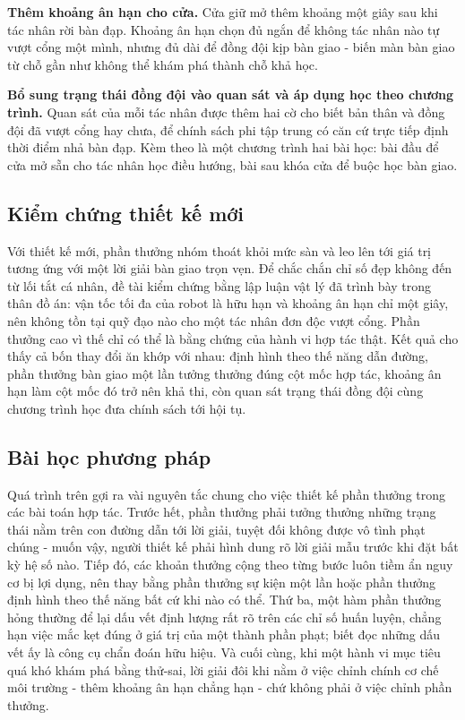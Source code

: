 \indent \textbf{Thêm khoảng ân hạn cho cửa.} Cửa giữ mở thêm khoảng một giây sau khi tác
nhân rời bàn đạp. Khoảng ân hạn chọn đủ ngắn để không tác nhân nào tự vượt cổng một mình,
nhưng đủ dài để đồng đội kịp bàn giao - biến màn bàn giao từ chỗ gần như không thể khám
phá thành chỗ khả học.

\indent \textbf{Bổ sung trạng thái đồng đội vào quan sát và áp dụng học theo chương
trình.} Quan sát của mỗi tác nhân được thêm hai cờ cho biết bản thân và đồng đội đã vượt
cổng hay chưa, để chính sách phi tập trung có căn cứ trực tiếp định thời điểm nhả bàn đạp.
Kèm theo là một chương trình hai bài học: bài đầu để cửa mở sẵn cho tác nhân học điều
hướng, bài sau khóa cửa để buộc học bàn giao.

\subsection{Kiểm chứng thiết kế mới}
\indent Với thiết kế mới, phần thưởng nhóm thoát khỏi mức sàn và leo lên tới giá trị tương
ứng với một lời giải bàn giao trọn vẹn. Để chắc chắn chỉ số đẹp không đến từ lối tắt cá
nhân, đề tài kiểm chứng bằng lập luận vật lý đã trình bày trong thân đồ án: vận tốc tối đa
của robot là hữu hạn và khoảng ân hạn chỉ một giây, nên không tồn tại quỹ đạo nào cho một
tác nhân đơn độc vượt cổng. Phần thưởng cao vì thế chỉ có thể là bằng chứng của hành vi
hợp tác thật. Kết quả cho thấy cả bốn thay đổi ăn khớp với nhau: định hình theo thế năng
dẫn đường, phần thưởng bàn giao một lần tưởng thưởng đúng cột mốc hợp tác, khoảng ân hạn
làm cột mốc đó trở nên khả thi, còn quan sát trạng thái đồng đội cùng chương trình học đưa
chính sách tới hội tụ.

\subsection{Bài học phương pháp}
\indent Quá trình trên gợi ra vài nguyên tắc chung cho việc thiết kế phần thưởng trong các
bài toán hợp tác. Trước hết, phần thưởng phải tưởng thưởng những trạng thái nằm trên con
đường dẫn tới lời giải, tuyệt đối không được vô tình phạt chúng - muốn vậy, người thiết kế
phải hình dung rõ lời giải mẫu trước khi đặt bất kỳ hệ số nào. Tiếp đó, các khoản thưởng
cộng theo từng bước luôn tiềm ẩn nguy cơ bị lợi dụng, nên thay bằng phần thưởng sự kiện
một lần hoặc phần thưởng định hình theo thế năng bất cứ khi nào có thể. Thứ ba, một hàm
phần thưởng hỏng thường để lại dấu vết định lượng rất rõ trên các chỉ số huấn luyện, chẳng
hạn việc mắc kẹt đúng ở giá trị của một thành phần phạt; biết đọc những dấu vết ấy là công
cụ chẩn đoán hữu hiệu. Và cuối cùng, khi một hành vi mục tiêu quá khó khám phá bằng
thử-sai, lời giải đôi khi nằm ở việc chỉnh chính cơ chế môi trường - thêm khoảng ân hạn
chẳng hạn - chứ không phải ở việc chỉnh phần thưởng.
